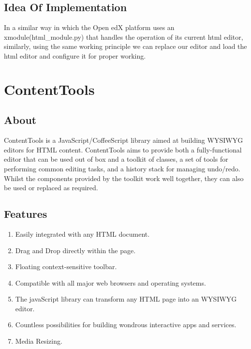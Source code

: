 \subsection{Idea Of Implementation}
In a similar way in which the Open edX platform uses an xmodule(html\_module.py) that
handles the operation of its current html editor, similarly, using the same working principle
we can replace our editor and load the html editor and configure it for proper working.

\section{ContentTools}
\subsection{About}
ContentTools is a JavaScript/CoffeeScript library aimed at building WYSIWYG editors for
HTML content. ContentTools aims to provide both a fully-functional editor that can be used
out of box and a toolkit of classes, a set of tools for performing common editing tasks, and a
history stack for managing undo/redo. Whilst the components provided by the toolkit work
well together, they can also be used or replaced as required. \newline
\subsection{Features}
\begin{enumerate}
\item Easily integrated with any HTML document.
\item Drag and Drop directly within the page.
\item Floating context-sensitive toolbar.
\item Compatible with all major web browsers and operating systems.
\item The javaScript library can transform any HTML page into an WYSIWYG editor.
\item Countless possibilities for building wondrous interactive apps and services.
\item Media Resizing.
\end{enumerate}

